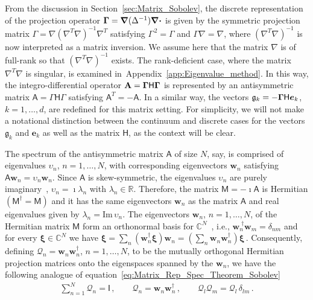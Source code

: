 \documentclass[english,12pt,jmp,graphicx]{revtex4-1}
\newcommand{\vecw}{\boldsymbol{w}}
\newcommand{\vecxi}{\boldsymbol{\xi}}
\newcommand{\vecg}{\mathfrak{g}}
\newcommand{\vece}{\boldsymbol{e}}
\newcommand{\secref}[1]{Section~\ref{#1}}
\newcommand{\appref}[1]{Appendix~\ref{#1}}
\newcommand{\bnabla}{\mbox{\boldmath${\nabla}$}}
\newcommand{\bGamma}{\mbox{\boldmath${\Gamma}$}}
\newcommand{\bcdot}{\mbox{\boldmath${\cdot}$}}
\newcommand{\Ag}{\mathfrak{A}}
\newcommand{\Dg}{\mathfrak{D}}
\newcommand{\Imag}{\mbox{Im}\,}
\newcommand{\Hm}{\mathsf{H}}
\newcommand{\Mm}{\mathsf{M}}
\newcommand{\Am}{\mathsf{A}}
\newcommand{\Ib}{\mathsf{I}}
\newcommand{\Ab}{\mathbf{A}}
\newcommand{\Qc}{\mathcal{Q}}
\begin{document}
From the discussion in \secref{sec:Matrix_Sobolev}, the discrete
representation of the projection operator
$\bGamma=\bnabla(\Delta^{-1})\bnabla\bcdot$ is given by the 
symmetric projection matrix
$\Gamma=\nabla(\nabla^T\nabla)^{-1}\nabla^T$ satisfying 
$\Gamma^{\,2}=\Gamma$ and $\Gamma\nabla=\nabla$, 
where $(\nabla^T\nabla)^{-1}$ is now interpreted as a matrix inversion. We
assume here that the matrix $\nabla$ is of full-rank so that $(\nabla^T\nabla)^{-1}$
exists. The rank-deficient case, where the matrix $\nabla^T\nabla$ is  
singular, is examined in~\appref{app:Eigenvalue_method}. 
In this way, the integro-differential operator $\Ab=\bGamma\Hm\bGamma$ 
is represented by
an antisymmetric matrix 
$\Am=\Gamma\Hm\Gamma$ 
satisfying $\Am^T=-\Am$.
In a similar way, the vectors
$\vecg_k=-\bGamma\Hm\vece_k$, $k=1,\ldots,d$, are redefined for this matrix
setting. For simplicity, we will not make a notational distinction
between the continuum and discrete cases for the vectors $\vecg_k$ and 
$\vece_k$ as well as the matrix $\Hm$, as the
context will be clear. 



 
The spectrum of the antisymmetric matrix $\Am$ of size $N$, say,
is comprised of eigenvalues $\upsilon_n$, $n=1,\ldots,N$, with
corresponding eigenvectors  $\vecw_n$ satisfying 
$\Am\vecw_n=\upsilon_n\vecw_n$. Since $\Am$ is skew-symmetric, the
eigenvalues $\upsilon_n$ are purely imaginary~\cite{Horn_Johnson-1990},
$\upsilon_n=\imath\lambda_n$ with 
$\lambda_n\in\mathbb{R}$. Therefore, the matrix $\Mm=-\imath\Am$ is Hermitian
$(\Mm^\dagger=\Mm)$ and it has the same eigenvectors $\vecw_n$ as the matrix
$\Am$ and real eigenvalues given by $\lambda_n=\Imag\upsilon_n$. The
eigenvectors $\vecw_n$, $n=1,\ldots,N$, of the Hermitian matrix $\Mm$
form an orthonormal basis for
$\mathbb{C}^N$~\cite{Keener-2000,Horn_Johnson-1990}, i.e.,  
$\vecw_n^{\;\dagger}\vecw_m=\delta_{nm}$ and for every $\vecxi\in\mathbb{C}^N$ we
have $\vecxi=\sum_n(\vecw_n^\dagger\vecxi)\vecw_n
=\left(\sum_n\vecw_n\vecw_n^\dagger\right)\vecxi\,.$ Consequently,
defining $\Qc_n=\vecw_n\vecw_n^\dagger$, $n=1,\ldots,N$, to be the
mutually orthogonal Hermitian projection matrices onto 
the eigenspaces spanned by the $\vecw_n$, we have the following
analogue of 
equation~\eqref{eq:Matrix_Rep_Spec_Theorem_Sobolev} 
%
\begin{align}\label{eq:Matrix_Rep_Spec_Theorem}
  \sum_{n=1}^N\Qc_n=\Ib\,, \qquad
  \Qc_n=\vecw_n\vecw_n^\dagger\,,  \qquad
  \Qc_l \Qc_m=\Qc_l\,\delta_{l m}\,.
\end{align}
%
\end{document}
